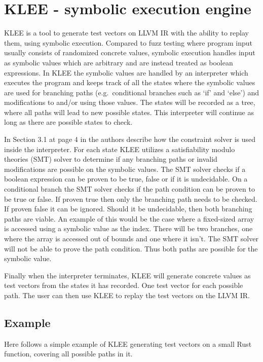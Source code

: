 \section{KLEE - symbolic execution engine}
KLEE\cite{kleepaper} is a tool to generate test vectors on LLVM IR with the
ability to replay them, using symbolic execution. Compared to fuzz testing
where program input usually consists of randomized concrete values, symbolic
execution handles input as symbolic values which are arbitrary and are instead
treated as boolean expressions. In KLEE the symbolic values are handled by an
interpreter which executes the program and keeps track of all the states where
the symbolic values are used for branching paths (e.g.\ conditional branches
such as `if' and `else') and modifications to and/or using those values. The
states will be recorded as a tree, where all paths will lead to new possible
states.  This interpreter will continue as long as there are possible states to
check.

In Section 3.1 at page 4 in \cite{kleepaper} the authors describe how the
constraint solver is used inside the interpreter. For each state KLEE utilizes
a satisfiability modulo theories (SMT) solver to determine if any branching
paths or invalid modifications are possible on the symbolic values. The SMT
solver checks if a boolean expression can be proven to be true, false or if it
is undecidable. On a conditional branch the SMT solver checks if the path
condition can be proven to be true or false. If proven true then only the
branching path needs to be checked. If proven false it can be ignored. Should
it be undecidable, then both branching paths are viable. An example of this
would be the case where a fixed-sized array is accessed using a symbolic value
as the index. There will be two branches, one where the array is accessed out
of bounds and one where it isn't. The SMT solver will not be able to prove the
path condition. Thus both paths are possible for the symbolic value.

Finally when the interpreter terminates, KLEE will generate concrete values as
test vectors from the states it has recorded. One test vector for each possible
path. The user can then use KLEE to replay the test vectors on the LLVM IR.

\subsection{Example}
Here follows a simple example of KLEE generating test vectors on a small Rust
function, covering all possible paths in it.

